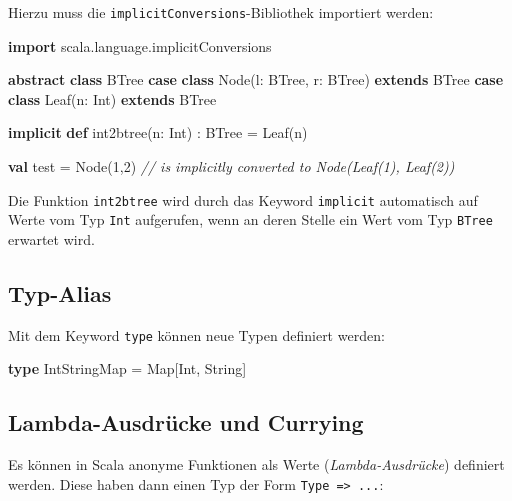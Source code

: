 \documentclass[]{article}
\newenvironment{Shaded}{}{}
\newcommand{\CommentTok}[1]{\textcolor[rgb]{0.38,0.63,0.69}{\textit{#1}}}
\newcommand{\DecValTok}[1]{\textcolor[rgb]{0.25,0.63,0.44}{#1}}
\newcommand{\FunctionTok}[1]{\textcolor[rgb]{0.02,0.16,0.49}{#1}}
\newcommand{\KeywordTok}[1]{\textcolor[rgb]{0.00,0.44,0.13}{\textbf{#1}}}
\newcommand{\NormalTok}[1]{#1}
\begin{document}
Hierzu muss die \texttt{implicitConversions}-Bibliothek importiert
werden:

\begin{Shaded}
\begin{Highlighting}[]
\KeywordTok{import}\NormalTok{ scala.}\FunctionTok{language}\NormalTok{.}\FunctionTok{implicitConversions}

\KeywordTok{abstract} \KeywordTok{class}\NormalTok{ BTree}
\KeywordTok{case} \KeywordTok{class}\NormalTok{ Node(l: BTree, r: BTree) }\KeywordTok{extends}\NormalTok{ BTree}
\KeywordTok{case} \KeywordTok{class} \FunctionTok{Leaf}\NormalTok{(n: Int) }\KeywordTok{extends}\NormalTok{ BTree}

\KeywordTok{implicit} \KeywordTok{def} \FunctionTok{int2btree}\NormalTok{(n: Int) : BTree = }\FunctionTok{Leaf}\NormalTok{(n)}

\KeywordTok{val}\NormalTok{ test = Node(}\DecValTok{1}\NormalTok{,}\DecValTok{2}\NormalTok{) }\CommentTok{// is implicitly converted to Node(Leaf(1), Leaf(2))}
\end{Highlighting}
\end{Shaded}

Die Funktion \texttt{int2btree} wird durch das Keyword \texttt{implicit}
automatisch auf Werte vom Typ \texttt{Int} aufgerufen, wenn an deren
Stelle ein Wert vom Typ \texttt{BTree} erwartet wird.

\hypertarget{typ-alias}{%
\subsection{Typ-Alias}\label{typ-alias}}

Mit dem Keyword \texttt{type} können neue Typen definiert werden:

\begin{Shaded}
\begin{Highlighting}[]
\KeywordTok{type}\NormalTok{ IntStringMap = Map[Int, String]}
\end{Highlighting}
\end{Shaded}

\hypertarget{lambda-ausdruxfccke-und-currying}{%
\subsection{Lambda-Ausdrücke und
Currying}\label{lambda-ausdruxfccke-und-currying}}

Es können in Scala anonyme Funktionen als Werte
(\emph{Lambda-Ausdrücke}) definiert werden. Diese haben dann einen Typ
der Form \texttt{Type\ =\textgreater{}\ ...}:
\end{document}
